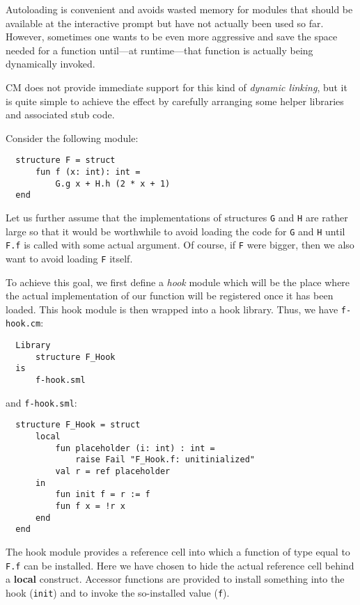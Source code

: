 \documentclass[titlepage,letterpaper]{article}
\begin{document}
Autoloading is convenient and avoids wasted memory for modules that
should be available at the interactive prompt but have not actually
been used so far.  However, sometimes one wants to be even more
aggressive and save the space needed for a function until---at
runtime---that function is actually being dynamically invoked.

CM does not provide immediate support for this kind of {\em dynamic
linking}, but it is quite simple to achieve the effect by carefully
arranging some helper libraries and associated stub code.

Consider the following module:
\begin{verbatim}
  structure F = struct
      fun f (x: int): int =
          G.g x + H.h (2 * x + 1)
  end
\end{verbatim}

Let us further assume that the implementations of structures {\tt G}
and {\tt H} are rather large so that it would be worthwhile to avoid
loading the code for {\tt G} and {\tt H} until {\tt F.f} is called
with some actual argument.  Of course, if {\tt F} were bigger, then we
also want to avoid loading {\tt F} itself.

To achieve this goal, we first define a {\em hook} module which will
be the place where the actual implementation of our function will be
registered once it has been loaded.  This hook module is then wrapped
into a hook library.  Thus, we have {\tt f-hook.cm}:
\begin{verbatim}
  Library
      structure F_Hook
  is
      f-hook.sml
\end{verbatim}

and {\tt f-hook.sml}:

\begin{verbatim}
  structure F_Hook = struct
      local
          fun placeholder (i: int) : int =
              raise Fail "F_Hook.f: unitinialized"
          val r = ref placeholder
      in
          fun init f = r := f
          fun f x = !r x
      end
  end
\end{verbatim}

The hook module provides a reference cell into which a function of
type equal to {\tt F.f} can be installed.  Here we have chosen to hide
the actual reference cell behind a {\bf local} construct.  Accessor
functions are provided to install something into the hook
({\tt init}) and to invoke the so-installed value ({\tt f}).
\end{document}
